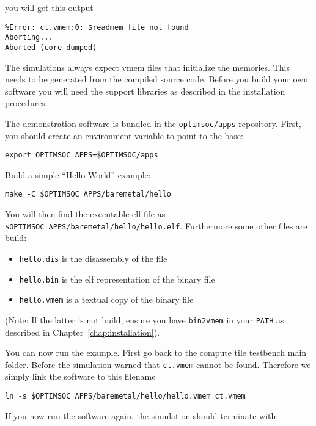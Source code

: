 you will get this output

\begin{lstlisting}
%Error: ct.vmem:0: $readmem file not found
Aborting...
Aborted (core dumped)
\end{lstlisting}

The simulations always expect vmem files that initialize the memories.
This needs to be generated from the compiled source code. Before you
build your own software you will need the support libraries as
described in the installation procedures.

The demonstration software is bundled in the \verb|optimsoc/apps|
repository. First, you should create an environment variable to point
to the base:

\begin{lstlisting}
export OPTIMSOC_APPS=$OPTIMSOC/apps
\end{lstlisting}

Build a simple ``Hello World'' example:

\begin{lstlisting}
make -C $OPTIMSOC_APPS/baremetal/hello
\end{lstlisting}

You will then find the executable elf file as
\verb|$OPTIMSOC_APPS/baremetal/hello/hello.elf|.
Furthermore some other files are build:

\begin{itemize}
\item \verb|hello.dis| is the disassembly of the file
\item \verb|hello.bin| is the elf representation of the binary file
\item \verb|hello.vmem| is a textual copy of the binary file
\end{itemize}

(Note: If the latter is not build, ensure you have \verb|bin2vmem| in
your \verb|PATH| as described in Chapter~\ref{chap:installation}).

You can now run the example. First go back to the compute tile
testbench main folder. Before the simulation warned that
\verb|ct.vmem| cannot be found. Therefore we simply link the software
to this filename

\begin{lstlisting}
ln -s $OPTIMSOC_APPS/baremetal/hello/hello.vmem ct.vmem
\end{lstlisting}

If you now run the software again, the simulation should
terminate with:

